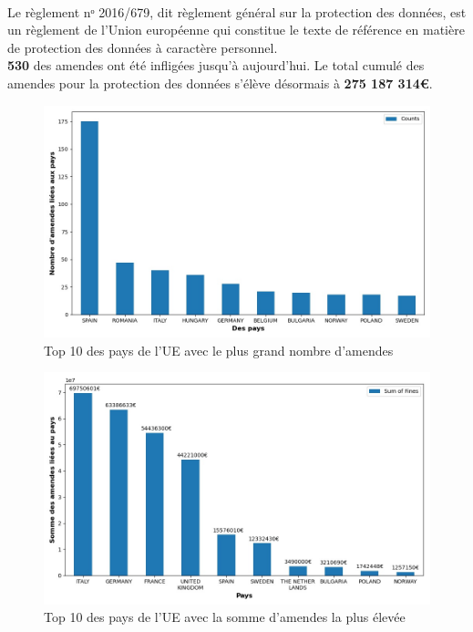 \documentclass[french]{article}
\begin{document}

\noindent\HorRule{3pt} \\[-0.75\baselineskip]
\HorRule{1pt}

\vspace{0.5cm}
	\SepRule
\vspace{0.5cm}


\justify
Le règlement nᵒ 2016/679, dit règlement général sur la protection des données, est un règlement de l'Union européenne qui constitue le texte de référence en matière de protection des données à caractère personnel. \\
\textbf{530} des amendes ont été infligées jusqu'à aujourd'hui.
Le total cumulé des amendes pour la protection des données s'élève désormais à \textbf{275 187 314€}.


\begin{figure}
	[H]\centering\includegraphics[width=0.7\linewidth]{graphs/top10_countries}
      \caption{Top 10 des pays de l'UE avec le plus grand nombre d'amendes}
\end{figure}
\begin{figure}
	[H]\centering\includegraphics[width=0.7\linewidth]{graphs/top10_countries_fines}
	\caption{Top 10 des pays de l'UE avec la somme d'amendes la plus élevée}
 \end{figure}
\end{document}

